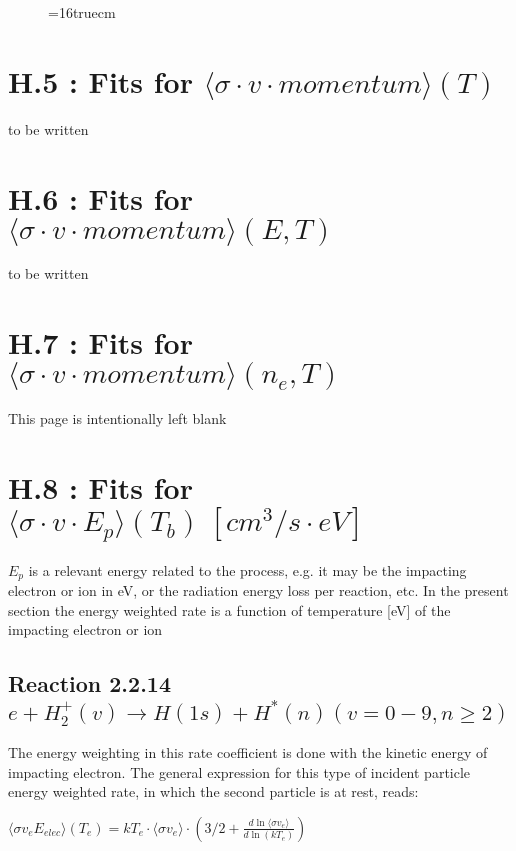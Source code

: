 \documentclass[12pt,dvipdfmx]{article}
\begin{document}
\begin{figure} \label{2.2.17mad}
\epsfxsize=16truecm
\end{figure}
\newpage

\section{H.5 : Fits for $\langle\sigma \cdot v \cdot momentum \rangle (T) $}

to be written

\newpage

\section{H.6 : Fits for $\langle\sigma \cdot v \cdot momentum \rangle (E,T) $ }

to be written

\newpage

\section{H.7 : Fits for $\langle\sigma \cdot v \cdot momentum \rangle (n_e,T) $ }

\newpage
This page is intentionally left blank
\newpage

\section{H.8 : Fits for $\langle\sigma \cdot v \cdot E_p \rangle (T_b) \ [cm^3/s
\cdot eV]$}

$E_p$ is a relevant energy related to the process, e.g. it may be the impacting electron or ion in eV,
or the radiation energy loss per reaction, etc.
In the present section
the energy weighted rate is a function of temperature [eV] of the
impacting electron or ion

\subsection{
Reaction 2.2.14   $e + H_2^+(v) \rightarrow H(1s) + H^*(n)   (v=0-9, n \ge 2) $
}
The energy weighting in this rate coefficient is done with the kinetic energy of
impacting electron. The general expression for this type of incident particle energy weighted
rate, in which the second particle is at rest, reads:

$\langle\sigma v_e E_{elec}\rangle(T_e) = kT_e \cdot \langle\sigma v_e\rangle \cdot
\left(3/2 + \frac{d \ln \langle\sigma v_e\rangle}{d \ln(kT_e)}\right)$
\end{document}

